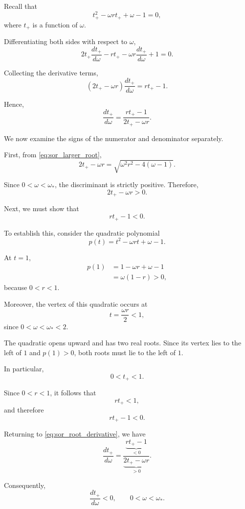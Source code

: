 \documentclass[11pt,a4paper]{article}
\theoremstyle{definition}
\theoremstyle{remark}
\begin{document}
Recall that
\[
    t_+^2-\omega rt_++\omega-1=0,
\]
where $t_+$ is a function of $\omega$.

Differentiating both sides with respect
to $\omega$,
\[
    2t_+\frac{dt_+}{d\omega}
    -rt_+
    -\omega r\frac{dt_+}{d\omega}
    +1=0.
\]

Collecting the derivative terms,
\[
    (2t_+-\omega r)
    \frac{dt_+}{d\omega}
    =
    rt_+-1.
\]

Hence,
\begin{equation}
    \boxed{
    \frac{dt_+}{d\omega}
    =
    \frac{rt_+-1}{2t_+-\omega r}.
    }
    \label{eq:sor_root_derivative}
\end{equation}

We now examine the signs of the numerator
and denominator separately.

First, from
\eqref{eq:sor_larger_root},
\[
    2t_+-\omega r
    =
    \sqrt{\omega^2r^2-4(\omega-1)}.
\]

Since $0<\omega<\omega_*$, the
discriminant is strictly positive.
Therefore,
\[
    \boxed{2t_+-\omega r>0.}
\]

Next, we must show that
\[
    rt_+-1<0.
\]

To establish this, consider the quadratic
polynomial
\[
    p(t)=t^2-\omega rt+\omega-1.
\]

At $t=1$,
\[
\begin{aligned}
    p(1)
    &=1-\omega r+\omega-1\\
    &=\omega(1-r)>0,
\end{aligned}
\]
because $0<r<1$.

Moreover, the vertex of this quadratic
occurs at
\[
    t=\frac{\omega r}{2}<1,
\]
since $0<\omega<\omega_*<2$.

The quadratic opens upward and has two
real roots. Since its vertex lies to the
left of $1$ and $p(1)>0$, both roots
must lie to the left of $1$.

In particular,
\[
    \boxed{0<t_+<1.}
\]

Since $0<r<1$, it follows that
\[
    rt_+<1,
\]
and therefore
\[
    \boxed{rt_+-1<0.}
\]

Returning to
\eqref{eq:sor_root_derivative},
we have
\[
    \frac{dt_+}{d\omega}
    =
    \frac{
        \underbrace{rt_+-1}_{<0}
    }{
        \underbrace{2t_+-\omega r}_{>0}
    }.
\]

Consequently,
\begin{equation}
    \boxed{
    \frac{dt_+}{d\omega}<0,
    \qquad 0<\omega<\omega_*.
    }
    \label{eq:sor_root_decreasing}
\end{equation}
\end{document}
